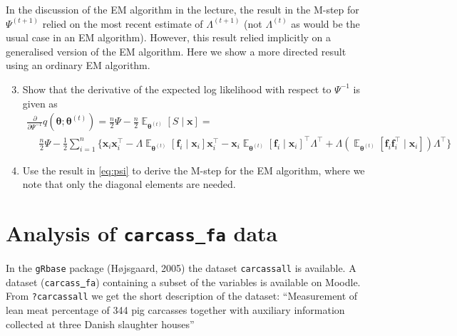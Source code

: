 \documentclass{article}
\DeclareMathOperator{\E}{\mathbb{E}}
\newcommand{\bx}{\ensuremath{\bm{x}}}
\newcommand{\bmf}{\ensuremath{\bm{f}}}
\newcommand{\Lm}{\ensuremath{\Lambda}}
\newcommand{\diff}[1]{\ensuremath{{\frac{\partial}{\partial#1}}}}
\newcommand{\bt}{\ensuremath{{\bm{\theta}}}}
\newcommand{\bti}[1]{\ensuremath{{\bm{\theta}^{(#1)}}}}
\begin{document}
In the discussion of the EM algorithm in the lecture, the result in
the M-step for $\Psi^{(t+1)}$ relied on the most recent estimate of
$\Lm^{(t+1)}$ (not $\Lm^{(t)}$ as would be the usual case in an EM
algorithm). However, this result relied implicitly on a generalised
version of the EM algorithm. Here we show a more directed result using
an ordinary EM algorithm.

\begin{enumerate}
  \setcounter{enumi}{2}
\item Show that the derivative of the expected log likelihood with
  respect to $\Psi^{-1}$ is given as
\begin{multline}
  \diff{\Psi^{-1}}q(\bt; \bti{t}) = \frac{n}{2}\Psi -
  \frac{n}{2}\E_{\bti{t}}[S\mid \bx] = \\
 ~\quad\frac{n}{2}\Psi -\frac{1}{2}\sum_{i=1}^n
 \{\bx_i\bx_i^\top - \Lm\E_{\bti{t}}[\bmf_i\mid\bx_i]\bx_i^\top -
  \bx_i\E_{\bti{t}}[\bmf_i\mid\bx_i]^\top\Lm^\top +
  \Lm(\E_{\bti{t}}[\bmf_i\bmf_i^\top\mid\bx_i])\Lm^\top\} \label{eq:psi}
\end{multline}
\item Use the result in \eqref{eq:psi} to derive the M-step for the EM
  algorithm, where we note that only the diagonal elements are needed.
\end{enumerate}

\section{Analysis of \texttt{carcass\underline{~}fa} data}

In the \texttt{gRbase} package (H{\o}jsgaard, 2005) the dataset
\texttt{carcassall} is available. A dataset
(\texttt{carcass\underline{~}fa}) containing a subset of the variables
is available on Moodle. From \texttt{?carcassall} we get the short
description of the dataset: ``Measurement of lean meat percentage of
344 pig carcasses together with auxiliary information collected at
three Danish slaughter houses''
\end{document}
